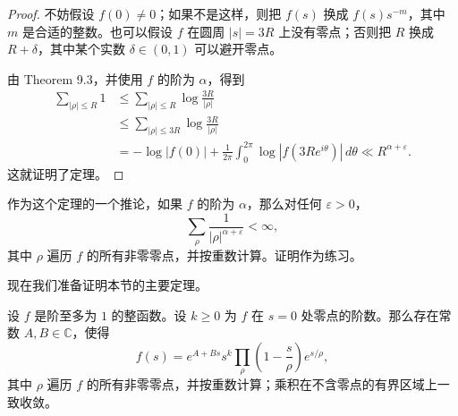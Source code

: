 \begin{proof}
	不妨假设 $f(0)\neq0$；如果不是这样，则把 $f(s)$ 换成 $f(s)s^{-m}$，其中 $m$ 是合适的整数。也可以假设 $f$ 在圆周 $|s|=3R$ 上没有零点；否则把 $R$ 换成 $R+\delta$，其中某个实数 $\delta\in(0,1)$ 可以避开零点。

	由 Theorem 9.3，并使用 $f$ 的阶为 $\alpha$，得到
	\[
	\begin{aligned}
		\sum_{|\rho|\leq R}1
		&\leq
		\sum_{|\rho|\leq R}\log\frac{3R}{|\rho|} \\
		&\leq
		\sum_{|\rho|\leq 3R}\log\frac{3R}{|\rho|} \\
		&=
		-\log|f(0)|
		+
		\frac{1}{2\pi}
		\int_0^{2\pi}
		\log|f(3Re^{i\theta})|\,d\theta
		\ll R^{\alpha+\varepsilon}.
	\end{aligned}
	\]
	这就证明了定理。
\end{proof}

\begin{remark}
	作为这个定理的一个推论，如果 $f$ 的阶为 $\alpha$，那么对任何 $\varepsilon>0$，
	\[
		\sum_\rho \frac{1}{|\rho|^{\alpha+\varepsilon}}<\infty,
	\]
	其中 $\rho$ 遍历 $f$ 的所有非零零点，并按重数计算。证明作为练习。
\end{remark}

现在我们准备证明本节的主要定理。

\begin{theorem}
	设 $f$ 是阶至多为 $1$ 的整函数。设 $k\geq0$ 为 $f$ 在 $s=0$ 处零点的阶数。那么存在常数 $A,B\in\mathbb C$，使得
	\[
		f(s)
		=
		e^{A+Bs}s^k
		\prod_\rho
		\left(1-\frac{s}{\rho}\right)e^{s/\rho},
	\]
	其中 $\rho$ 遍历 $f$ 的所有非零零点，并按重数计算；乘积在不含零点的有界区域上一致收敛。
\end{theorem}


